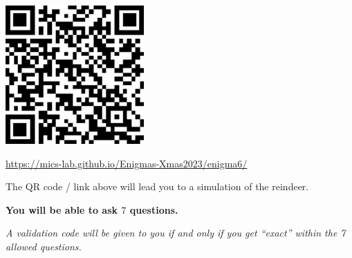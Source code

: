 \documentclass[a4paper, top=10mm]{article}
\begin{document}
	\begin{center}
		\includegraphics[height=150pt]{06QR.png}
		
		\url{https://mics-lab.github.io/Enigmas-Xmas2023/enigma6/}
	\end{center}
	
	The QR code / link above will lead you to a simulation of the reindeer.
	
	\textbf{You will be able to ask $7$ questions.}
	
	\textit{A validation code will be given to you if and only if you get “exact” within the 7 allowed questions.}
	
\end{document}
